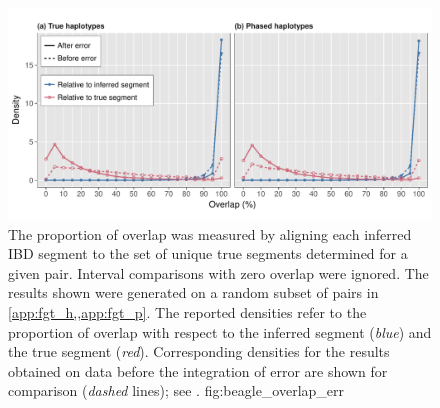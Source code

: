 

\begin{figure}[!htb]
\includegraphics[width=\textwidth]{./img/ch4/beagle_overlap_err}
{The proportion of overlap was measured by aligning each inferred IBD segment to the set of unique true segments determined for a given pair.
Interval comparisons with zero overlap were ignored.
The results shown were generated on a random subset of  pairs in \cref{app:fgt_h,,app:fgt_p}.
The reported densities refer to the proportion of overlap with respect to the inferred segment (\emph{blue}) and the true segment (\emph{red}).
Corresponding densities for the results obtained on data before the integration of error are shown for comparison (\emph{dashed} lines); see .
\AdditionLabel}
{fig:beagle_overlap_err}
\end{figure}
